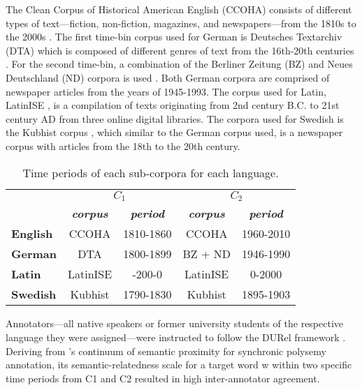 The Clean Corpus of Historical American English (CCOHA) consists of different types of text—fiction, non-fiction, magazines, and newspapers—from the 1810s to the 2000s \citep{davies2012expanding, alatrash-etal-2020-ccoha}. The first time-bin corpus used for German is Deutsches Textarchiv (DTA) which is composed of different genres of text from the 16th-20th centuries \citep{dta2017}. For the second time-bin, a combination of the Berliner Zeitung (BZ) and Neues Deutschland (ND) corpora is used \citep{berliner2018,neues2018}. Both German corpora are comprised of newspaper articles from the years of 1945-1993. The corpus used for Latin, LatinISE \citep{mcgillivray-kilgarriff}, is a compilation of texts originating from 2nd century B.C. to 21st century AD from three online digital libraries. The corpora used for Swedish is the Kubhist corpus \citep{Kubhist}, which similar to the German corpus used, is a newspaper corpus with articles from the 18th to the 20th century. \hfill \break
\begin{table}[h]
\small
\centering
\begin{tabular}{l|cc|cc|}
\cline{2-5}
\textbf{}      & \multicolumn{2}{c|}{\textbf{$C_1$}}                    & \multicolumn{2}{c|}{\textbf{$C_2$}}                    \\
                                       & \textit{\textbf{corpus}} & \textit{\textbf{period}} & \textit{\textbf{corpus}} & \textit{\textbf{period}} \\ \hline
\multicolumn{1}{|l|}{\textbf{English}} & CCOHA                    & 1810-1860                & CCOHA                    & 1960-2010                \\ \hline
\multicolumn{1}{|l|}{\textbf{German}}  & DTA                      & 1800-1899                & BZ + ND                  & 1946-1990                \\ \hline
\multicolumn{1}{|l|}{\textbf{Latin}}   & LatinISE                 & -200-0                   & LatinISE                 & 0-2000                   \\ \hline
\multicolumn{1}{|l|}{\textbf{Swedish}} & Kubhist                  & 1790-1830                & Kubhist                  & 1895-1903                \\ \hline
\end{tabular}
\caption{Time periods of each sub-corpora for each language.}
\label{tab:subcorpora-time}
\end{table}
\hfill \break
Annotators—all native speakers or former university students of the respective language they were assigned—were instructed to follow the DURel framework \citep{DURel2018}. Deriving from \citet{blank1997prinzipien}’s continuum of semantic proximity for synchronic polysemy annotation, its semantic-relatedness scale for a target word w within two specific time periods from C1 and C2 resulted in high inter-annotator agreement. 
	

